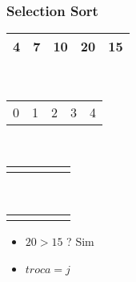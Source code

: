 \documentclass{beamer}
\begin{document}
\begin{frame}
    \frametitle{Selection Sort}
    \begin{center}
        \begin{table}
            \begin{tabular}{| p{0.25cm} | p{0.25cm} | p{0.25cm} | p{0.25cm} | p{0.25cm} |}
                \hline
                4 & 7 & 10 & 20 & 15 \\ \hline
            \end{tabular} \\
            \begin{tabular}{p{0.25cm} p{0.25cm} p{0.25cm} p{0.25cm} p{0.25cm}}
                0 & 1 & 2 & 3 & 4
            \end{tabular} \\
            \begin{tabular}{p{0.25cm} p{0.25cm} p{0.25cm} p{0.25cm} p{0.25cm}}
                 & & & \color{blue}{$\uparrow$} & \color{red}{$\uparrow$}
            \end{tabular} \\
            \begin{tabular}{p{0.25cm} p{0.25cm} p{0.25cm} p{0.25cm} p{0.25cm}}
                 & & & \color{blue}{i} & \color{red}{j}
            \end{tabular}
        \end{table}
	\end{center}
    \color{green}{$troca = 3$}
    \begin{itemize}[<+->]
        \item $20 > 15$ ? Sim
        \item $troca = j$
    \end{itemize}
\end{frame}
\end{document}
